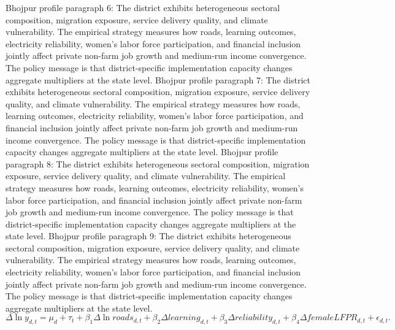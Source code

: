 \documentclass[preprint,12pt]{elsarticle}
\begin{document}
Bhojpur profile paragraph 6: The district exhibits heterogeneous sectoral composition, migration exposure, service delivery quality, and climate vulnerability. The empirical strategy measures how roads, learning outcomes, electricity reliability, women's labor force participation, and financial inclusion jointly affect private non-farm job growth and medium-run income convergence. The policy message is that district-specific implementation capacity changes aggregate multipliers at the state level.
Bhojpur profile paragraph 7: The district exhibits heterogeneous sectoral composition, migration exposure, service delivery quality, and climate vulnerability. The empirical strategy measures how roads, learning outcomes, electricity reliability, women's labor force participation, and financial inclusion jointly affect private non-farm job growth and medium-run income convergence. The policy message is that district-specific implementation capacity changes aggregate multipliers at the state level.
Bhojpur profile paragraph 8: The district exhibits heterogeneous sectoral composition, migration exposure, service delivery quality, and climate vulnerability. The empirical strategy measures how roads, learning outcomes, electricity reliability, women's labor force participation, and financial inclusion jointly affect private non-farm job growth and medium-run income convergence. The policy message is that district-specific implementation capacity changes aggregate multipliers at the state level.
Bhojpur profile paragraph 9: The district exhibits heterogeneous sectoral composition, migration exposure, service delivery quality, and climate vulnerability. The empirical strategy measures how roads, learning outcomes, electricity reliability, women's labor force participation, and financial inclusion jointly affect private non-farm job growth and medium-run income convergence. The policy message is that district-specific implementation capacity changes aggregate multipliers at the state level.
\begin{equation}\Delta \ln y_{d,t}=\mu_d+\tau_t+\beta_1\Delta\ln roads_{d,t}+\beta_2\Delta learning_{d,t}+\beta_3\Delta reliability_{d,t}+\beta_4\Delta femaleLFPR_{d,t}+\epsilon_{d,t}.\end{equation}
\end{document}
